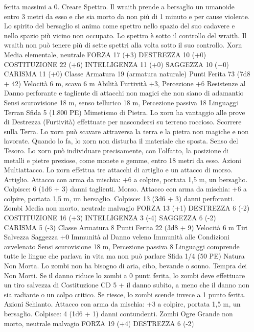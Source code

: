 \begin{multicols}{2}
ferita massimi a 0.
Creare Spettro. Il wraith prende a bersaglio un umanoide entro 3
metri da esso e che sia morto da non più di 1 minuto e per cause
violente. Lo spirito del bersaglio si anima come spettro nello
spazio del suo cadavere e nello spazio più vicino non occupato.
Lo spettro è sotto il controllo del wraith. Il wraith non può tenere
più di sette spettri alla volta sotto il suo controllo.
Xorn
Media elementale, neutrale
FORZA 17 (+3)
DESTREZZA 10 (+0)
COSTITUZIONE 22 (+6)
INTELLIGENZA 11 (+0)
SAGGEZZA 10 (+0)
CARISMA 11 (+0)
Classe Armatura 19 (armatura naturale)
Punti Ferita 73 (7d8 + 42)
Velocità 6 m, scavo 6 m
Abilità Furtività +3, Percezione +6
Resistenze al Danno perforante e tagliente di attacchi non
magici che non siano di adamantio
Sensi scurovisione 18 m, senso tellurico 18 m, Percezione
passiva 18
Linguaggi Terran
Sfida 5 (1.800 PE)
Mimetismo di Pietra. Lo xorn ha vantaggio alle prove di
Destrezza (Furtività) effettuate per nascondersi su terreno
roccioso.
Scorrere sulla Terra. Lo xorn può scavare attraversa la terra e la
pietra non magiche e non lavorate. Quando lo fa, lo xorn non
disturba il materiale che sposta.
Senso del Tesoro. Lo xorn può individuare precisamente, con
l’olfatto, la posizione di metalli e pietre preziose, come monete e
gemme, entro 18 metri da esso.
Azioni
Multiattacco. Lo xorn effettua tre attacchi di artiglio e un attacco
di morso.
Artiglio. Attacco con arma da mischia: +6 a colpire, portata 1,5
m, un bersaglio.
Colpisce: 6 (1d6 + 3) danni taglienti.
Morso. Attacco con arma da mischia: +6 a colpire, portata 1,5
m, un bersaglio.
Colpisce: 13 (3d6 + 3) danni perforanti.
Zombi
Media non morto, neutrale malvagio
FORZA 13 (+1)
DESTREZZA 6 (-2)
COSTITUZIONE 16 (+3)
INTELLIGENZA 3 (-4)
SAGGEZZA 6 (-2)
CARISMA 5 (-3)
Classe Armatura 8
Punti Ferita 22 (3d8 + 9)
Velocità 6 m
Tiri Salvezza Saggezza +0
Immunità al Danno veleno
Immunità alle Condizioni avvelenato
Sensi scurovisione 18 m, Percezione passiva 8
Linguaggi comprende tutte le lingue che parlava in vita ma non
può parlare
Sfida 1/4 (50 PE)
Natura Non Morta. Lo zombi non ha bisogno di aria, cibo,
bevande o sonno.
Tempra dei Non Morti. Se il danno riduce lo zombi a 0 punti
ferita, lo zombi deve effettuare un tiro salvezza di Costituzione
CD 5 + il danno subito, a meno che il danno non sia radiante o
un colpo critico. Se riesce, lo zombi scende invece a 1 punto
ferita.
Azioni
Schianto. Attacco con arma da mischia: +3 a colpire, portata 1,5
m, un bersaglio.
Colpisce: 4 (1d6 + 1) danni contundenti.
Zombi Ogre
Grande non morto, neutrale malvagio
FORZA 19 (+4)
DESTREZZA 6 (-2)

\end{multicols}
